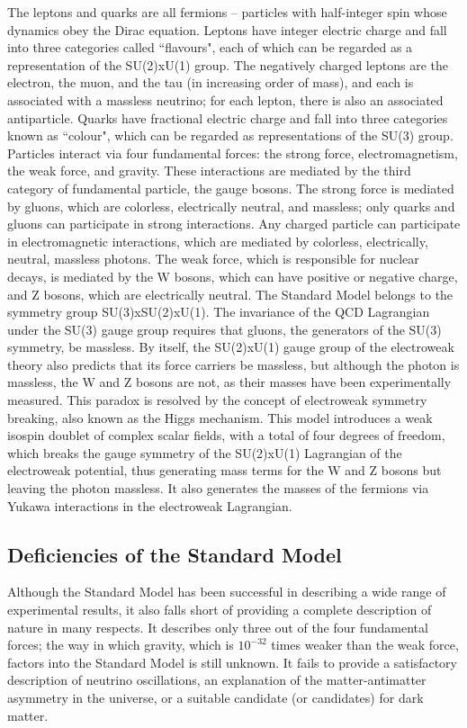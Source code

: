 The leptons and quarks are all fermions -- particles with half-integer spin whose dynamics obey the Dirac equation. Leptons have integer electric charge and fall into three categories called ``flavours", each of which can be regarded as a representation of the SU(2)xU(1) group. The negatively charged leptons are the electron, the muon, and the tau (in increasing order of mass), and each is associated with a massless neutrino; for each lepton, there is also an associated antiparticle. Quarks have fractional electric charge and fall into three categories known as ``colour", which can be regarded as representations of the SU(3) group.
Particles interact via four fundamental forces: the strong force, electromagnetism, the weak force, and gravity. These interactions are mediated by the third category of fundamental particle, the gauge bosons. The strong force is mediated by gluons, which are colorless, electrically neutral, and massless; only quarks and gluons can participate in strong interactions. Any charged particle can participate in electromagnetic interactions, which are mediated by colorless, electrically, neutral, massless photons. The weak force, which is responsible for nuclear decays, is mediated by the W bosons, which can have positive or negative charge, and Z bosons, which are electrically neutral.
The Standard Model belongs to the symmetry group SU(3)xSU(2)xU(1). The invariance of the QCD Lagrangian under the SU(3) gauge group requires that gluons, the generators of the SU(3) symmetry, be massless. By itself, the SU(2)xU(1) gauge group of the electroweak theory also predicts that its force carriers be massless, but although the photon is massless, the W and Z bosons are not, as their masses have been experimentally measured. This paradox is resolved by the concept of electroweak symmetry breaking, also known as the Higgs mechanism. This model introduces a weak isospin doublet of complex scalar fields, with a total of four degrees of freedom, which breaks the gauge symmetry of the SU(2)xU(1) Lagrangian of the electroweak potential, thus generating mass terms for the W and Z bosons but leaving the photon massless. It also generates the masses of the fermions via Yukawa interactions in the electroweak Lagrangian.

\subsection{Deficiencies of the Standard Model\label{sec:SMdeficiencies}}

Although the Standard Model has been successful in describing a wide range of experimental results, it also falls short of providing a complete description of nature in many respects. It describes only three out of the four fundamental forces; the way in which gravity, which is $10^{-32}$ times weaker than the weak force, factors into the Standard Model is still unknown. It fails to provide a satisfactory description of neutrino oscillations, an explanation of the matter-antimatter asymmetry in the universe, or a suitable candidate (or candidates) for dark matter.

